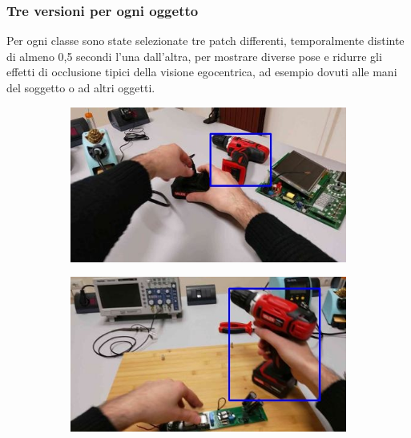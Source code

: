 \subsubsection*{Tre versioni per ogni oggetto}
Per ogni classe sono state selezionate tre patch differenti, temporalmente distinte di almeno 0,5 secondi l'una dall'altra, per mostrare diverse pose e ridurre gli effetti di occlusione tipici della visione egocentrica, ad esempio dovuti alle mani del soggetto o ad altri oggetti.

\begin{figure}[ht]
    \centering
    \begin{subfigure}[b]{0.32\linewidth}
        \includegraphics[width=\linewidth]{Images/enigma_am_IMGVER1.jpg}
        \caption{}
        \label{fig:imgver1}
    \end{subfigure}
    \hfill
    \begin{subfigure}[b]{0.32\linewidth}
        \includegraphics[width=\linewidth]{Images/enigma_am_IMGVER2.jpg}
        \caption{}
        \label{fig:imgver2}
    \end{subfigure}
    \hfill
    \begin{subfigure}[b]{0.32\linewidth}

\end{subfigure}
\end{figure}

